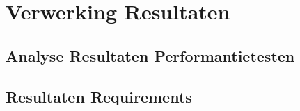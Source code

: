 
\chapter{Verwerking Resultaten}
\label{ch:verwerking-resultaten}

\section{Analyse Resultaten Performantietesten}
\label{sec:analyse-performantietesten}

\section{Resultaten Requirements}
\label{sec:resultaten-requirements}